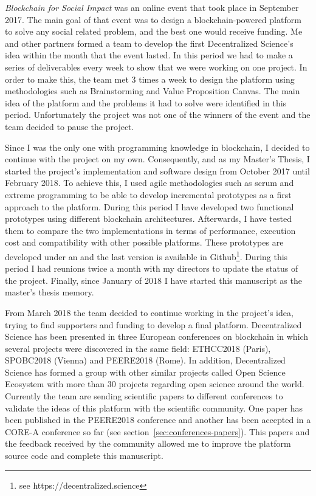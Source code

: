 \begin{itemize}
   \emph{Blockchain for Social Impact} was an online event
  that took place in September 2017. The main goal of that event was to design a
  blockchain-powered platform to solve any social related problem, and the best
  one would receive funding. Me and other partners formed a team to develop the
  first Decentralized Science's idea within the month that the event lasted. In
  this period we had to make a series of deliverables every week to show that we
  were working on one project. In order to make this, the team met 3 times a
  week to design the platform using methodologies such as Brainstorming and
  Value Proposition Canvas. The main idea of the platform and the problems it
  had to solve were identified in this period. Unfortunately the project was not
  one of the winners of the event and the team decided to pause the project.

   Since I was the only one with programming
  knowledge in blockchain, I decided to continue with the project on my own.
  Consequently, and as my Master's Thesis, I started the project's
  implementation and software design from October 2017 until February 2018. To
  achieve this, I used agile methodologies such as scrum and extreme programming
  to be able to develop incremental prototypes as a first approach to the
  platform. During this period I have developed two functional prototypes using
  different blockchain architectures. Afterwards, I have tested them to compare
  the two implementations in terms of performance, execution cost and
  compatibility with other possible platforms. These prototypes are developed
  under an  and the last version is available in
  Github\footnote{see https://decentralized.science}. During this period I had
  reunions twice a month with my directors to update the status of the project.
  Finally, since January of 2018 I have started this manuscript as the master's
  thesis memory.

   From March 2018 the team decided to continue working in
  the project's idea, trying to find supporters and funding to develop a final
  platform. Decentralized Science has been presented in three European
  conferences on blockchain in which several projects were discovered in the
  same field: ETHCC2018 (Paris), SPOBC2018 (Vienna) and PEERE2018 (Rome). In
  addition, Decentralized Science has formed a group with other similar projects
  called Open Science Ecosystem with more than 30 projects regarding open
  science around the world. Currently the team are sending scientific papers to
  different conferences to validate the ideas of this platform with the
  scientific community. One paper has been published in the PEERE2018 conference and
  another has been accepted in a CORE-A conference so far (see
  section~\ref{sec:conferences-papers}). This papers and the feedback received
  by the community allowed me to improve the platform source code and complete
  this manuscript.
  
\end{itemize}

